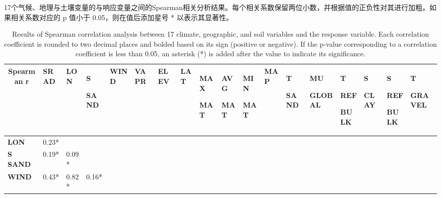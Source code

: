 \documentclass[AutoFakeBold]{LZUThesis-PgD&PhD}
\begin{document}
	
	\begin{table}[H]
		\captionsetup{
			margin=-3.17cm %
		}
		
		\caption{17个气候、地理与土壤变量的与响应变量之间的Spearman相关分析结果。每个相关系数保留两位小数，并根据值的正负性对其进行加粗。如果相关系数对应的 p 值小于 0.05，则在值后添加星号 * 以表示其显著性。 }
		\caption*{Results of Spearman correlation analysis between 17 climate, geographic, and soil variables and the response variable. Each correlation coefficient is rounded to two decimal places and bolded based on its sign (positive or negative). If the p-value corresponding to a correlation coefficient is less than 0.05, an asterisk (*) is added after the value to indicate its significance.}
		\label{tab:correlation_matrix}                                
		\tiny                                                         
		\hspace*{-3.17cm}                                             
		\begin{tabular}{p{1.6cm}p{0.68cm}p{0.68cm}p{0.68cm}p{0.68cm}p{0.68cm}p{0.68cm}p{0.68cm}p{0.68cm}p{0.68cm}p{0.68cm}p{0.68cm}p{0.68cm}p{0.68cm}p{0.68cm}p{0.68cm}p{0.68cm}p{0.68cm}}
			\toprule
			\multicolumn{1}{c}{Spearman r}  & \textbf{SRAD} & \textbf{LON} & \textbf{S} \par \textbf{SAND} & \textbf{WIND} & \textbf{VAPR} & \textbf{ELEV} & \textbf{LAT} & \textbf{MAX} \par \textbf{MAT} & \textbf{AVG} \par \textbf{MAT} & \textbf{MIN} \par \textbf{MAT} & \textbf{MAP} & \textbf{T} \par \textbf{SAND} & \textbf{MU} \par \textbf{GLOBAL} & \textbf{T} \par \textbf{REF} \par \textbf{BULK} & \textbf{S} \par \textbf{CLAY} & \textbf{S} \par \textbf{REF} \par \textbf{BULK} & \textbf{T} \par \textbf{GRAVEL} \\
			\midrule
			\textbf{LON} & 0.23* &  &  &  &  &  &  &  &  &  &  &  &  &  &  &  &  \\
			\textbf{S SAND} & 0.19* & 0.09* &  &  &  &  &  &  &  &  &  &  &  &  &  &  &  \\
			\textbf{WIND} & 0.43* & 0.82* & 0.16* &  &  &  &  &  &  &  &  &  &  &  &  &  &  \\

\end{tabular}
\end{table}
\end{document}
